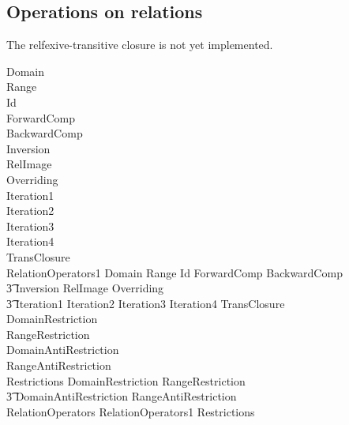 \documentclass{article}
\begin{document}
\subsection{Operations on relations}
The relfexive-transitive closure is not yet implemented.
\begin{zed}
  Domain \\
  Range \\
  Id \\
  ForwardComp \\
  BackwardComp \\
  Inversion \\
  RelImage \\
  Overriding \\
  Iteration1 \\
  Iteration2 \\
  Iteration3 \\
  Iteration4 \\
  TransClosure \\
  \also 
  RelationOperators1  Domain \land Range \land Id \land ForwardComp \land BackwardComp \land \\
  \t3 Inversion \land RelImage \land Overriding \land \\
  \t3 Iteration1 \land Iteration2 \land Iteration3 \land Iteration4 \land TransClosure\\
  \also
  DomainRestriction \\
  RangeRestriction \\
  DomainAntiRestriction \\
  RangeAntiRestriction \\
  Restrictions  DomainRestriction \land RangeRestriction \land \\
  \t3 DomainAntiRestriction \land RangeAntiRestriction\\
  \also
  RelationOperators  RelationOperators1 \land Restrictions
\end{zed}
\end{document}
